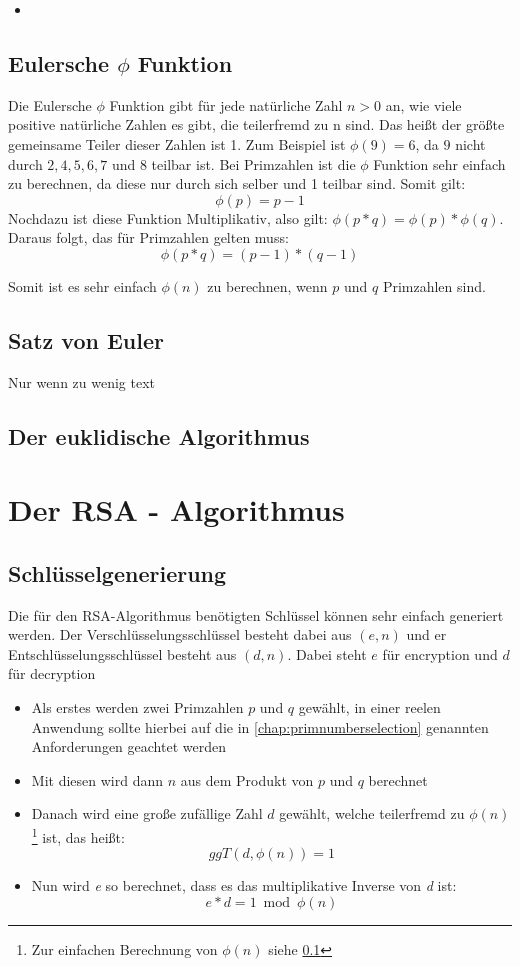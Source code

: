 \documentclass[12pt,a4paper]{scrartcl}
\begin{document}
	\begin{itemize}
	\item
	
	\end{itemize}
	
	\label{ch:einweg}
	\subsection{Eulersche $\phi$ Funktion}
	\label{cha:phi}
	
	Die Eulersche $\phi$ Funktion gibt für jede natürliche Zahl ${n > 0}$ an, wie viele positive natürliche Zahlen es gibt, die teilerfremd zu n sind. Das heißt der größte gemeinsame Teiler dieser Zahlen ist 1. Zum Beispiel ist ${\phi(9) = 6}$, da ${9}$ nicht durch ${2, 4, 5, 6, 7 }$ und $8$ teilbar ist. Bei Primzahlen ist die $\phi$ Funktion sehr einfach zu berechnen, da diese nur durch sich selber und 1 teilbar sind. Somit gilt: $${\phi(p) = p - 1}$$
	Nochdazu ist diese Funktion Multiplikativ, also gilt: ${\phi(p * q) = \phi(p) * \phi(q)}$.
	Daraus folgt, das für Primzahlen gelten muss:
	$${\phi(p * q) = (p - 1) * (q - 1)}$$
	
	Somit ist es sehr einfach $\phi(n)$ zu berechnen, wenn $p$ und $q$ Primzahlen sind.
	\subsection{Satz von Euler}
	Nur wenn zu wenig text
	
	\subsection{Der euklidische Algorithmus}

\section{Der RSA - Algorithmus}
		
	\subsection{Schlüsselgenerierung}
Die für den RSA-Algorithmus benötigten Schlüssel können sehr einfach generiert werden. Der Verschlüsselungsschlüssel besteht dabei aus $(e, n)$ und er Entschlüsselungsschlüssel besteht aus $(d, n)$. Dabei steht $e$ für encryption und $d$ für decryption 
\begin{itemize}
\item Als erstes werden zwei Primzahlen $p$ und $q$ gewählt, in einer reelen Anwendung sollte hierbei auf die in \ref{chap:primnumberselection} genannten Anforderungen geachtet werden  
\item Mit diesen wird dann $n$ aus dem Produkt von $p$ und $q$ berechnet
\item Danach wird eine große zufällige Zahl $d$ gewählt, welche teilerfremd zu ${\phi(n)}$\footnote{Zur einfachen Berechnung von ${\phi(n)}$ siehe \ref{cha:phi}} ist, das heißt:
$${ggT(d, \phi(n)) = 1}$$ 
\item Nun wird \textit{e} so berechnet, dass es das multiplikative Inverse von \textit{d} ist:
$${e * d = 1 \bmod \phi(n)}$$
\end{itemize}
\end{document}
